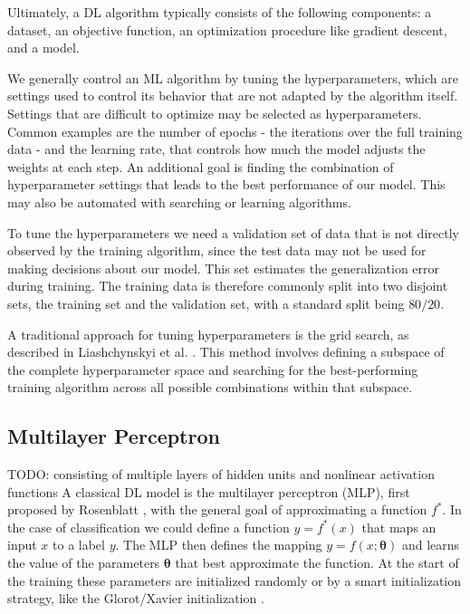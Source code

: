 Ultimately, a DL algorithm typically consists of the following components: a dataset, an objective function, an optimization procedure like gradient descent, and a model. %

We generally control an ML algorithm by tuning the hyperparameters, which are settings used to control its behavior that are not adapted by the algorithm itself. Settings that are difficult to optimize may be selected as hyperparameters. Common examples are the number of epochs - the iterations over the full training data - and the learning rate, that controls how much the model adjusts the weights at each step. An additional goal is finding the combination of hyperparameter settings that leads to the best performance of our model. This may also be automated with searching or learning algorithms.

To tune the hyperparameters we need a validation set of data that is not directly observed by the training algorithm, since the test data may not be used for making decisions about our model. This set estimates the generalization error during training. The training data is therefore commonly split into two disjoint sets, the training set and the validation set, with a standard split being $80/20$.

A traditional approach for tuning hyperparameters is the grid search, as described in Liashchynskyi et al. \cite{liashchynskyi2019grid}. This method involves defining a subspace of the complete hyperparameter space and searching for the best-performing training algorithm across all possible combinations within that subspace.

\subsection{Multilayer Perceptron}
TODO: consisting of multiple layers of hidden units and nonlinear activation functions
A classical DL model is the multilayer perceptron (MLP), first proposed by Rosenblatt \cite{rosenblatt1958perceptron}, with the general goal of approximating a function $f^*$. In the case of classification we could define a function $y = f^*(x)$ that maps an input $x$ to a label $y$. The MLP then defines the mapping $y = f(x;\boldsymbol{\theta})$ and learns the value of the parameters $\boldsymbol{\theta}$ that best approximate the function. At the start of the training these parameters are initialized randomly or by a smart initialization strategy, like the Glorot/Xavier initialization \cite{glorot2010understanding}. 

